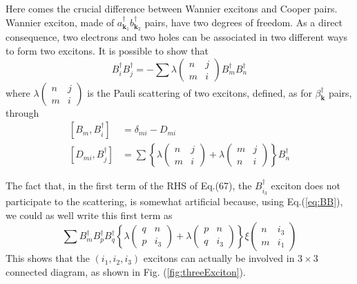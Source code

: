 \documentclass[epj]{svjour}
\newcommand{\vk}{\ensuremath{\mathbf{k}}}
\begin{document}
Here comes the crucial difference between Wannier excitons and Cooper pairs. Wannier exciton, made of $a^\dagger_{\vk_1}b^\dagger_{\vk_2}$ pairs, have two degrees of freedom. As a direct consequence,  two electrons and two holes can be associated in two different ways to form two excitons. It is possible to show \cite{CobosonPhysicsReports} that
\begin{equation}\label{eq:BB}
B^\dagger_iB^\dagger_j=-\sum\lambda\left(\begin{smallmatrix}n&j\\m&i\end{smallmatrix}%
\right)  B^{\dagger}_{m}B^{\dagger}_{n}
\end{equation}
where $\lambda\left(\begin{smallmatrix}n&j\\m&i\end{smallmatrix}\right)$  is the Pauli scattering of two excitons, defined, as for $\beta^\dagger_\vk$ pairs, through
\begin{equation}
\begin{split}
\left[B_m,B^{\dagger}_{i}\right]&=\delta_{mi}-D_{mi}\\
\left[D_{mi},B^{\dagger}_{j}\right]&=\sum\left\{\lambda\left(\begin{smallmatrix}n&j\\m&i\end{smallmatrix}\right)
+\lambda\left(\begin{smallmatrix}m&j\\n&i\end{smallmatrix}\right)\right\} B^{\dagger}_{n}
\end{split}
\end{equation}

The fact that, in the first term of the RHS of Eq.(67), the $B^\dagger_{i_3}$ exciton does not participate to the scattering, is  somewhat artificial because, using Eq.(\ref{eq:BB}), we could as well write this first term as
\begin{equation}\label{eq:3BLambdaXi}
\sum{}B^\dagger_mB^\dagger_pB^\dagger_q\left\{\lambda\left(\begin{smallmatrix}q&n\\p&i_3\end{smallmatrix}\right)
+\lambda\left(\begin{smallmatrix}p&n\\q&i_3\end{smallmatrix}\right)\right\} \xi\left(\begin{smallmatrix}n&i_3\\m&i_1\end{smallmatrix}\right)
\end{equation}
This shows that the $(i_1,i_2,i_3)$ excitons can actually be involved in $3\times3$ connected diagram, as shown in Fig. (\ref{fig:threeExciton}).
\end{document}
